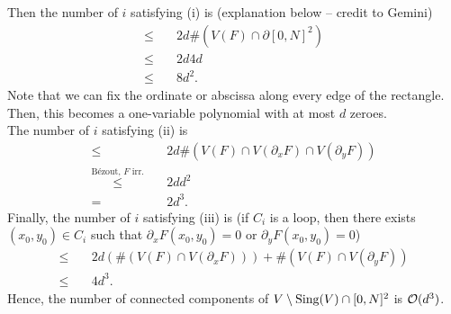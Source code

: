 \documentclass{Vorlesungstemplate_English} %
\begin{document}
Then the number of $i$ satisfying (i) is {\color{blue}(explanation below -- credit to Gemini)}
\begin{align*}
  \leq \quad & 2d\#(V(F) \cap \partial[0,N]^2) \\
  \leq \quad & 2d4d \\
  \leq \quad & 8d^2.
\end{align*}
{\color{blue} Note that we can fix the ordinate or abscissa along every edge of the rectangle. Then, this becomes a one-variable polynomial with at most $d$ zeroes.} \\
The number of $i$ satisfying (ii) is
\begin{align*}
  \leq \quad & 2d\#(V(F)\cap V(\partial_xF) \cap V(\partial_yF)) \\
  \stackrel{\text{Bézout, } F \text{ irr.}}{\leq} \quad & 2dd^2 \\
  = \quad & 2d^3.
\end{align*}
Finally, the number of $i$ satisfying (iii) is (if $C_i$ is a loop, then there exists $(x_0,y_0) \in C_i$ such that $\partial_xF(x_0,y_0) = 0$ or $\partial_yF(x_0,y_0) = 0$)
\begin{align*}
  \leq \quad & 2d(\#(V(F) \cap V(\partial_xF))) + \#(V(F) \cap V(\partial_yF)) \\
  \leq \quad & 4d^3.
\end{align*}
Hence, the number of connected components of $V \setminus \text{Sing}(V) \cap [0,N]^2$ is $\mathcal{O}(d^3)$.
\end{document}
